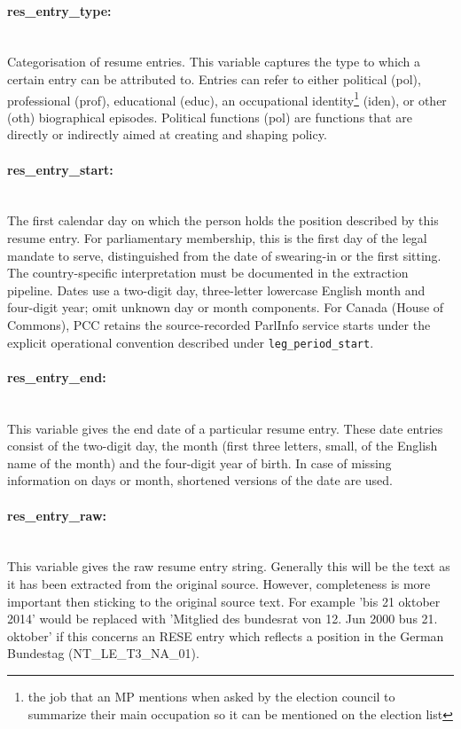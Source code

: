 \documentclass{article}
\begin{document}
\paragraph{res\_entry\_type:}\\
    Categorisation of resume entries. This variable captures the type to which a certain entry can be attributed to. Entries can refer to either political (pol), professional (prof), educational (educ), an occupational identity\footnote{the job that an MP mentions when asked by the election council to summarize their main occupation so it can be mentioned on the election list} (iden), or other (oth) biographical episodes. Political functions (pol) are functions that are directly or indirectly aimed at creating and shaping policy.
 
\paragraph{res\_entry\_start:}\\
    The first calendar day on which the person holds the position described by this resume entry. For parliamentary membership, this is the first day of the legal mandate to serve, distinguished from the date of swearing-in or the first sitting. The country-specific interpretation must be documented in the extraction pipeline. Dates use a two-digit day, three-letter lowercase English month and four-digit year; omit unknown day or month components. For Canada (House of Commons), PCC retains the source-recorded ParlInfo service starts under the explicit operational convention described under \texttt{leg\_period\_start}.
    
\paragraph{res\_entry\_end:}\\
    This variable gives the end date of a particular resume entry. These date entries consist of the two-digit day, the month (first three letters, small, of the English name of the month) and the four-digit year of birth. In case of missing information on days or month, shortened versions of the date are used.

\paragraph{res\_entry\_raw:}\\
    This variable gives the raw resume entry string. Generally this will be the text as it has been extracted from the original source. However, completeness is more important then sticking to the original source text. For example 'bis 21 oktober 2014' would be replaced with 'Mitglied des bundesrat von 12. Jun 2000 bus 21. oktober' if this concerns an RESE entry which reflects a position in the German Bundestag (NT\_LE\_T3\_NA\_01).
    
\end{document}
